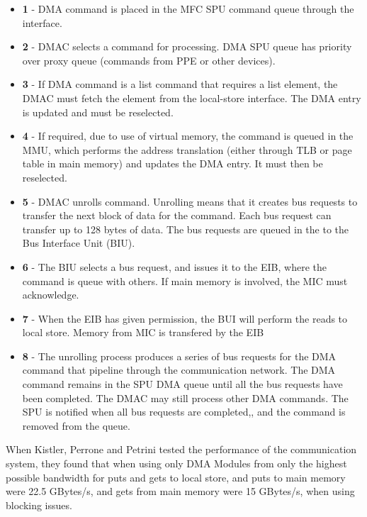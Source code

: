\begin{itemize}
    \item \textbf{1} - DMA command is placed in the MFC SPU command queue through the interface.
    \item \textbf{2} - DMAC selects a command for processing. DMA SPU queue has priority over proxy queue (commands from PPE or other devices).
    \item \textbf{3} - If DMA command is a list command that requires a list element, the DMAC must fetch the element from the local-store interface. 
    The DMA entry is updated and must be reselected.
    \item \textbf{4} - If required, due to use of virtual memory, the command is queued in the MMU, which performs the address translation (either through TLB or page table in main memory) and updates the DMA entry. 
    It must then be reselected.
    \item \textbf{5} - DMAC unrolls command.
    Unrolling means that it creates bus requests to transfer the next block of data for the command.
    Each bus request can transfer up to 128 bytes of data.
    The bus requests are queued in the to the Bus Interface Unit (BIU).
    \item \textbf{6} - The BIU selects a bus request, and issues it to the EIB, where the command is queue with others.
    If main memory is involved, the MIC must acknowledge.
    \item \textbf{7} - When the EIB has given permission, the BUI will perform the reads to local store.
    Memory from MIC is transfered by the EIB
    \item \textbf{8} - The unrolling process produces a series of bus requests for the DMA command that pipeline through the communication network.
    The DMA command remains in the SPU DMA queue until all the bus requests have been completed.
    The DMAC may still process other DMA commands.
    The SPU is notified when all bus requests are completed,, and the command is removed from the queue. 
\end{itemize}


When Kistler, Perrone and Petrini tested the performance of the communication system, they found that when using only DMA Modules from only the highest possible bandwidth for puts and gets to local store, and puts to main memory were 22.5 GBytes/s, and gets from main memory were 15 GBytes/s, when using blocking issues.
